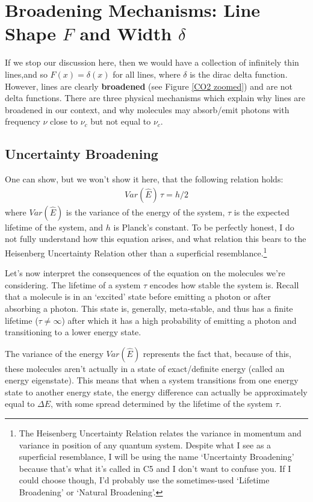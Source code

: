 \section{Broadening Mechanisms: Line Shape\texorpdfstring{ $F$}{} and Width\texorpdfstring{ $\delta$}{}}\label{Broadening}

If we stop our discussion here, then we would have a collection of infinitely thin lines,and so $F(x)=\delta(x)$ for all lines, where $\delta$ is the dirac delta function. However, lines are clearly \textbf{broadened} (see Figure \ref{CO2 zoomed}) and are not delta functions. There are three physical mechanisms which explain why lines are broadened in our context, and why molecules may absorb/emit photons with frequency $\nu$ close to $\nu_c$ but not equal to $\nu_c$.

\subsection{Uncertainty Broadening}

One can show, but we won't show it here, that the following relation holds:
\begin{align*}
    Var(\hat{E})\,\tau=h/2
\end{align*}
where $Var(\hat{E})$ is the variance of the energy of the system, $\tau$ is the expected lifetime of the system, and $h$ is Planck's constant. To be perfectly honest, I do not fully understand how this equation arises, and what relation this bears to the Heisenberg Uncertainty Relation other than a superficial resemblance.\footnote{
    The Heisenberg Uncertainty Relation relates the variance in momentum and variance in position of any quantum system. Despite what I see as a superficial resemblance, I will be using the name `Uncertainty Broadening' because that's what it's called in C5 and I don't want to confuse you. If I could choose though, I'd probably use the sometimes-used `Lifetime Broadening' or `Natural Broadening'.
}

Let's now interpret the consequences of the equation on the molecules we're considering. The lifetime of a system $\tau$ encodes how stable the system is. Recall that a molecule is in an `excited' state before emitting a photon or after absorbing a photon. This state is, generally, meta-stable, and thus has a finite lifetime ($\tau\neq\infty$) after which it has a high probability of emitting a photon and transitioning to a lower energy state.

The variance of the energy $Var(\hat{E})$ represents the fact that, because of this, these molecules aren't actually in a state of exact/definite energy (called an energy eigenstate). This means that when a system transitions from one energy state to another energy state, the energy difference can actually be approximately equal to $\Delta E$, with some spread determined by the lifetime of the system $\tau$.

